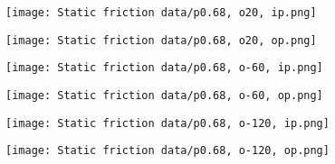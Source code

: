 \documentclass[12pt]{article}
\begin{document}
\begin{figure}[!h]
    \centering
    \begin{minipage}{0.49\textwidth}       
         \texttt{[image: Static friction data/p0.68, o20, ip.png]}
    \end{minipage}
    \begin{minipage}{0.49\textwidth}       
         \texttt{[image: Static friction data/p0.68, o20, op.png]}
    \end{minipage}

\end{figure}
\begin{figure}[!h]
    \centering
    \begin{minipage}{0.49\textwidth}       
         \texttt{[image: Static friction data/p0.68, o-60, ip.png]}
    \end{minipage}
    \begin{minipage}{0.49\textwidth}       
         \texttt{[image: Static friction data/p0.68, o-60, op.png]}
    \end{minipage}

\end{figure}
\begin{figure}[!h]
    \centering
    \begin{minipage}{0.49\textwidth}       
         \texttt{[image: Static friction data/p0.68, o-120, ip.png]}
    \end{minipage}
    \begin{minipage}{0.49\textwidth}       
         \texttt{[image: Static friction data/p0.68, o-120, op.png]}
    \end{minipage}

\end{figure}
\end{document}
